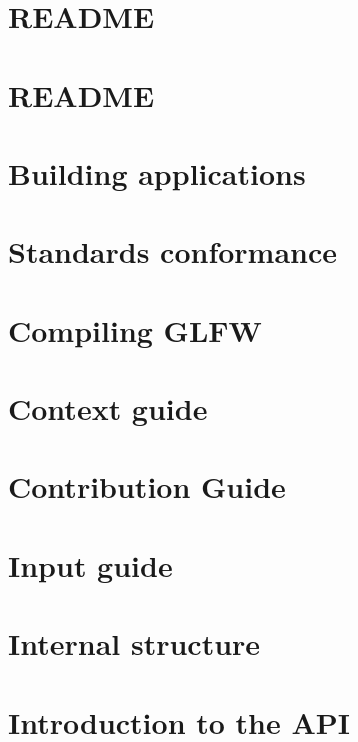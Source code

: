 \let\mypdfximage\pdfximage\def\pdfximage{\immediate\mypdfximage}\documentclass[twoside]{book}
\newcommand{\+}{\discretionary{\mbox{\scriptsize$\hookleftarrow$}}{}{}}
\begin{document}
\chapter{R\+E\+A\+D\+ME}
\label{md_ext_nanogui_ext_enoki_ext_pybind11_tools_clang_README}

\chapter{R\+E\+A\+D\+ME}
\label{md_ext_nanogui_ext_enoki_README}

\chapter{Building applications}
\label{build_guide}

\chapter{Standards conformance}
\label{compat_guide}

\chapter{Compiling G\+L\+FW}
\label{compile_guide}

\chapter{Context guide}
\label{context_guide}

\chapter{Contribution Guide}
\label{md_ext_nanogui_ext_glfw_docs_CONTRIBUTING}

\chapter{Input guide}
\label{input_guide}

\chapter{Internal structure}
\label{internals_guide}

\chapter{Introduction to the A\+PI}
\label{intro_guide}

\end{document}
